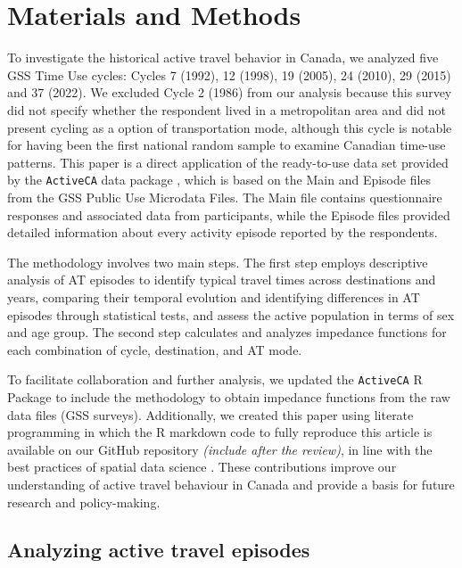 \documentclass[preprint, 3p,
authoryear]{elsarticle} %
\begin{document}
\section{Materials and Methods}\label{materials-and-methods}

To investigate the historical active travel behavior in Canada, we
analyzed five GSS Time Use cycles: Cycles 7 (1992), 12 (1998), 19
(2005), 24 (2010), 29 (2015) and 37 (2022). We excluded Cycle 2 (1986)
from our analysis because this survey did not specify whether the
respondent lived in a metropolitan area and did not present cycling as a
option of transportation mode, although this cycle is notable for having
been the first national random sample to examine Canadian time-use
patterns. This paper is a direct application of the ready-to-use data
set provided by the \texttt{ActiveCA} data package
\citeyearpar{dossantos2024ActiveCA}, which is based on the Main and
Episode files from the GSS Public Use Microdata Files. The Main file
contains questionnaire responses and associated data from participants,
while the Episode files provided detailed information about every
activity episode reported by the respondents.

The methodology involves two main steps. The first step employs
descriptive analysis of AT episodes to identify typical travel times
across destinations and years, comparing their temporal evolution and
identifying differences in AT episodes through statistical tests, and
assess the active population in terms of sex and age group. The second
step calculates and analyzes impedance functions for each combination of
cycle, destination, and AT mode.

To facilitate collaboration and further analysis, we updated the
\texttt{ActiveCA} R Package to include the methodology to obtain
impedance functions from the raw data files (GSS surveys). Additionally,
we created this paper using literate programming in which the R markdown
code to fully reproduce this article is available on our GitHub
repository \emph{(include after the review)}, in line with the best
practices of spatial data science \citep{arribas-bel2021, paez2021}.
These contributions improve our understanding of active travel behaviour
in Canada and provide a basis for future research and policy-making.

\subsection{Analyzing active travel
episodes}\label{analyzing-active-travel-episodes}
\end{document}

